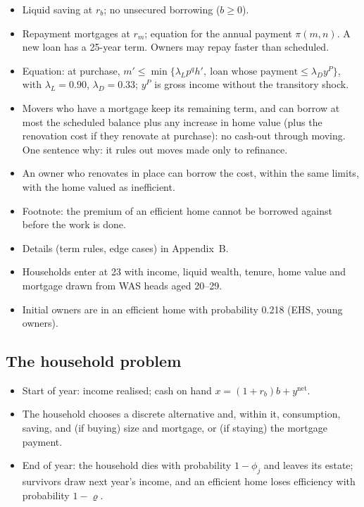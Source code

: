 \begin{itemize}
  \item Liquid saving at $r_b$; no unsecured borrowing ($b\ge 0$).
  \item Repayment mortgages at $r_m$; equation for the annual payment
    $\pi(m,n)$. A new loan has a 25-year term. Owners may repay faster
    than scheduled.
  \item Equation: at purchase,
    $m'\le\min\{\lambda_L p^q h',\ \text{loan whose payment}\le\lambda_D y^{P}\}$,
    with $\lambda_L=0.90$, $\lambda_D=0.33$; $y^{P}$ is gross income
    without the transitory shock.
  \item Movers who have a mortgage keep its remaining term, and can borrow
    at most the scheduled balance plus any increase in home value (plus
    the renovation cost if they renovate at purchase): no cash-out through
    moving. One sentence why: it rules out moves made only to refinance.
  \item An owner who renovates in place can borrow the cost, within the
    same limits, with the home valued as inefficient.
  \item Footnote: the premium of an efficient home cannot be borrowed
    against before the work is done.
  \item Details (term rules, edge cases) in Appendix~B.
\end{itemize}

\begin{itemize}
  \item Households enter at 23 with income, liquid wealth, tenure, home
    value and mortgage drawn from WAS heads aged 20--29.
  \item Initial owners are in an efficient home with probability 0.218
    (EHS, young owners).
\end{itemize}

\subsection{The household problem}

\begin{itemize}
  \item Start of year: income realised; cash on hand
    $x=(1+r_b)b+y^{\mathrm{net}}$.
  \item The household chooses a discrete alternative and, within it,
    consumption, saving, and (if buying) size and mortgage, or (if staying)
    the mortgage payment.
  \item End of year: the household dies with probability $1-\phi_j$ and
    leaves its estate; survivors draw next year's income, and an efficient
    home loses efficiency with probability $1-\varrho$.
\end{itemize}

